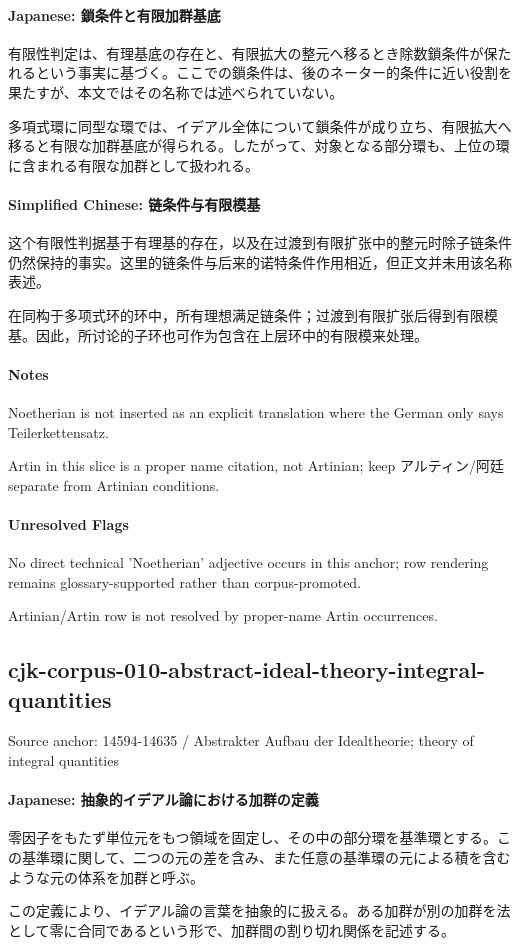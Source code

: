 \documentclass[11pt]{article}
\begin{document}
\paragraph{Japanese: 鎖条件と有限加群基底}
有限性判定は、有理基底の存在と、有限拡大の整元へ移るとき除数鎖条件が保たれるという事実に基づく。ここでの鎖条件は、後のネーター的条件に近い役割を果たすが、本文ではその名称では述べられていない。\par
多項式環に同型な環では、イデアル全体について鎖条件が成り立ち、有限拡大へ移ると有限な加群基底が得られる。したがって、対象となる部分環も、上位の環に含まれる有限な加群として扱われる。\par
\paragraph{Simplified Chinese: 链条件与有限模基}
这个有限性判据基于有理基的存在，以及在过渡到有限扩张中的整元时除子链条件仍然保持的事实。这里的链条件与后来的诺特条件作用相近，但正文并未用该名称表述。\par
在同构于多项式环的环中，所有理想满足链条件；过渡到有限扩张后得到有限模基。因此，所讨论的子环也可作为包含在上层环中的有限模来处理。\par
\paragraph{Notes}
Noetherian is not inserted as an explicit translation where the German only says Teilerkettensatz.\par
Artin in this slice is a proper name citation, not Artinian; keep アルティン/阿廷 separate from Artinian conditions.\par
\paragraph{Unresolved Flags}
No direct technical 'Noetherian' adjective occurs in this anchor; row rendering remains glossary-supported rather than corpus-promoted.\par
Artinian/Artin row is not resolved by proper-name Artin occurrences.\par
\subsection*{cjk-corpus-010-abstract-ideal-theory-integral-quantities}
Source anchor: 14594-14635 / Abstrakter Aufbau der Idealtheorie; theory of integral quantities
\par
\paragraph{Japanese: 抽象的イデアル論における加群の定義}
零因子をもたず単位元をもつ領域を固定し、その中の部分環を基準環とする。この基準環に関して、二つの元の差を含み、また任意の基準環の元による積を含むような元の体系を加群と呼ぶ。\par
この定義により、イデアル論の言葉を抽象的に扱える。ある加群が別の加群を法として零に合同であるという形で、加群間の割り切れ関係を記述する。\par
\end{document}
